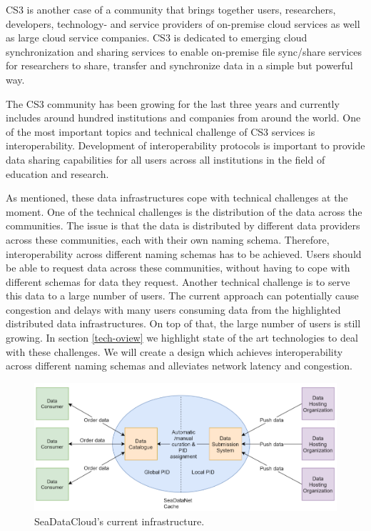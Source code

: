 CS3 is another case of a community that brings together users, researchers, developers, 
technology- and service providers of on-premise cloud services as well as large cloud service companies.
CS3 is dedicated to emerging cloud synchronization and sharing services 
to enable on-premise file sync/share services for researchers to share, transfer
and synchronize data in a simple but powerful way.

The CS3 community has been growing for the last three years and currently includes
around hundred institutions and companies from around the world.
One of the most important topics and technical challenge of CS3 services is interoperability. 
Development of interoperability protocols is important to provide data 
sharing capabilities for all users across all institutions in the field of education and research.

As mentioned, these data infrastructures cope with technical challenges at the moment. One of the technical challenges is the distribution of the data across the communities. The issue is that the data is distributed by different data providers across these communities, each with their own
naming schema. Therefore, interoperability across different naming schemas has to be achieved. Users should be able to request data across these communities, without having to cope with different schemas for data they request. Another technical challenge is to serve this data 
to a large number of users. The current approach can potentially cause congestion and delays with
many users consuming data from the highlighted distributed data infrastructures. On top of that, the large number of users is still growing. In section \ref{tech-oview} we highlight state of the art technologies to deal with these challenges. We will create a design which achieves interoperability across different naming schemas and alleviates network latency and congestion.

\begin{figure}[H]
\centering
\includegraphics[scale=0.6]{Images/SDC_current.png}
\caption{SeaDataCloud's current infrastructure.}
\label{fig:sdc_cur}
\end{figure}

